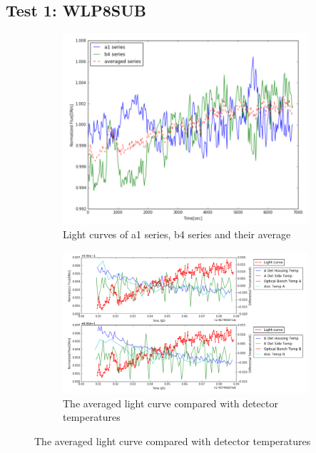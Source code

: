 \documentclass[conference]{IEEEtran}
\begin{document}
\subsection{Test 1: WLP8SUB} 
\begin{figure}[H]
    \centering
    \begin{subfigure}{1}
        \includegraphics[scale=0.4]{ts_test1}
        \caption{Light curves of a1 series, b4 series and their average}
    \end{subfigure}

    \begin{subfigure}{2}
        \includegraphics[scale=0.4]{temp_test1}
        \caption{The averaged light curve compared with detector temperatures}
    \end{subfigure}
   

\end{figure}
\end{document}

